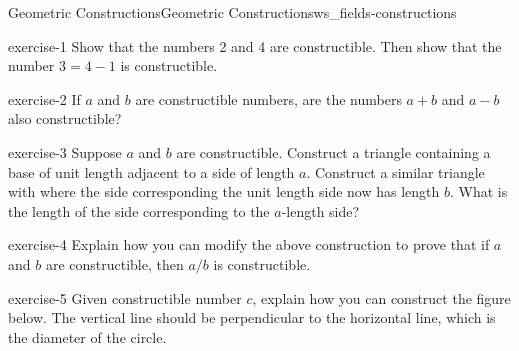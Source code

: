 \documentclass[oneside,11pt,]{article}
\begin{document}
\begin{worksheet-section-numberless}{Geometric Constructions}{}{Geometric Constructions}{}{}{ws_fields-constructions}
\begin{divisionexercise}{1}{}{}{exercise-1}%
\hypertarget{p-8}{}%
Show that the numbers 2 and 4 are constructible.  Then show that the number \(3 = 4 - 1\) is constructible.%
\end{divisionexercise}%
\begin{divisionexercise}{2}{}{}{exercise-2}%
\hypertarget{p-9}{}%
If \(a\) and \(b\) are constructible numbers, are the numbers \(a+b\) and \(a-b\) also constructible?%
\end{divisionexercise}%
\begin{divisionexercise}{3}{}{}{exercise-3}%
\hypertarget{p-10}{}%
Suppose \(a\) and \(b\) are constructible.  Construct a triangle containing a base of unit length adjacent to a side of length \(a\).  Construct a similar triangle with where the side corresponding the unit length side now has length \(b\).  What is the length of the side corresponding to the \(a\)-length side?%
\end{divisionexercise}%
\begin{divisionexercise}{4}{}{}{exercise-4}%
\hypertarget{p-12}{}%
Explain how you can modify the above construction to prove that if \(a\) and \(b\) are constructible, then \(a/b\) is constructible.%
\end{divisionexercise}%
\begin{divisionexercise}{5}{}{}{exercise-5}%
\hypertarget{p-14}{}%
Given constructible number \(c\), explain how you can construct the figure below.  The vertical line should be perpendicular to the horizontal line, which is the diameter of the circle.%
\begin{sidebyside}{1}{0.35}{0.35}{0}%
\begin{sbspanel}{0.3}%
\end{sbspanel}
\end{sidebyside}
\end{divisionexercise}
\end{worksheet-section-numberless}
\end{document}
